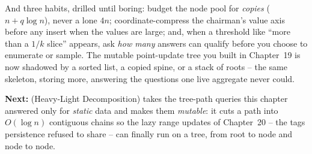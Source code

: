 \begin{lastword}
\medskip
And three habits, drilled until boring: budget the node pool for \emph{copies}
(\(n+q\log n\)), never a lone \(4n\); coordinate-compress the chairman's value axis before any
insert when the values are large; and, when a threshold like ``more than a \(1/k\) slice''
appears, ask \emph{how many} answers can qualify before you choose to enumerate or sample. The
mutable point-update tree you built in Chapter~19 is now shadowed by a sorted list, a copied
spine, or a stack of roots -- the same skeleton, storing more, answering the questions one live
aggregate never could.

\medskip
\textbf{Next:}  (Heavy-Light Decomposition) takes the tree-path queries this
chapter answered only for \emph{static} data and makes them \emph{mutable}: it cuts a path
into \(O(\log n)\) contiguous chains so the lazy range updates of Chapter~20 -- the tags
persistence refused to share -- can finally run on a tree, from root to node and node to node.
\end{lastword}
